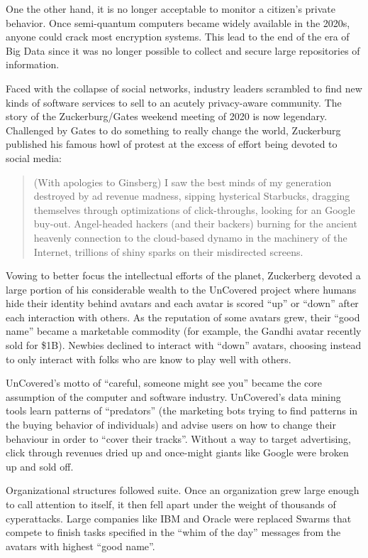 \documentclass[journal]{IEEEtran}
\begin{document}
\begin{itemize}
One the other hand, it is no longer acceptable to
monitor a citizen's private behavior.  Once
semi-quantum computers became widely available in
the 2020s, anyone could crack most encryption
systems.  This lead to the end of the era of Big
Data since it was no longer possible to collect and
secure large repositories of information.

Faced with the collapse of social networks, industry leaders scrambled
to find new kinds of software services to sell to an acutely privacy-aware
community.
The story of the Zuckerburg/Gates weekend meeting of 2020 is now legendary.
Challenged by Gates to do something to really change the world, Zuckerburg published his famous howl of protest at the excess of effort being devoted to
social media:
\begin{quote}
(With apologies to Ginsberg) I saw the best minds of my generation destroyed by ad revenue madness, sipping hysterical Starbucks, dragging themselves through optimizations of click-throughs, looking for an Google buy-out. Angel-headed hackers (and their backers) burning for the ancient heavenly connection to the cloud-based dynamo in the machinery of the Internet, trillions of shiny sparks on their misdirected screens.
\end{quote}
Vowing to better focus the intellectual efforts of the planet, 
Zuckerberg devoted a large portion of his considerable wealth to the UnCovered
project where humans hide their identity  behind avatars and each avatar is
scored ``up'' or ``down'' after each interaction with others. As the reputation of some avatars grew, their ``good name'' became a marketable  commodity (for example, the Gandhi avatar recently sold for \$1B). Newbies declined to interact with ``down'' avatars, choosing instead to only interact with folks who are know to play well with others. 

UnCovered's motto of ``careful, someone might see you'' became the core assumption of the computer and software industry. UnCovered's  data mining tools  learn  patterns of ``predators'' (the marketing bots trying to find  patterns in the buying behavior of individuals) and advise users on how to change
their behaviour in order to  ``cover their tracks''.
Without a way to target advertising, click through revenues dried up and once-might giants like Google were broken up and sold off. 


Organizational structures followed suite. Once an organization grew large enough to call attention to itself, it then fell apart under the weight of thousands of cyperattacks. Large companies
like  IBM and Oracle were replaced Swarms that
compete to finish tasks specified in the ``whim of the day'' messages from   the avatars
with highest ``good name''.


\end{itemize}
\end{document}
